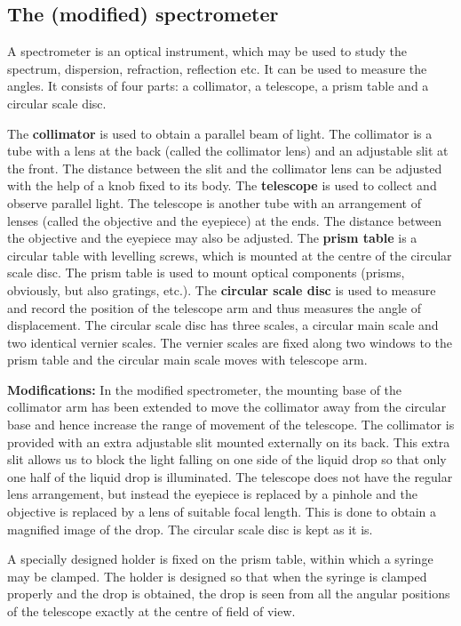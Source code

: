 \subsection*{The (modified) spectrometer}

A spectrometer is an optical instrument, which may be used to study the spectrum, dispersion, refraction, reflection etc. It can be used to measure the angles. It consists of four parts: a collimator, a telescope, a prism table and a circular scale disc.

The \textbf{collimator} is used to obtain a parallel beam of light. The collimator is a tube with a lens at the back (called the collimator lens) and an adjustable slit at the front. The distance between the slit and the collimator lens can be adjusted with the help of a knob fixed to its body. The \textbf{telescope} is used to collect and observe parallel light. The telescope is another tube with an arrangement of lenses (called the objective and the eyepiece) at the ends. The distance between the objective and the eyepiece may also be adjusted. The \textbf{prism table} is a circular table with levelling screws, which is mounted at the centre of the circular scale disc. The prism table is used to mount optical components (prisms, obviously, but also gratings, etc.).  The \textbf{circular scale disc} is used to measure and record the position of the telescope arm and thus measures the angle of displacement. The circular scale disc has three scales, a circular main scale and two identical vernier scales. The vernier scales are fixed along two windows to the prism table and the circular main scale moves with telescope arm.  

\textbf{Modifications:} In the modified spectrometer, the mounting base of the collimator arm has been extended to move the collimator away from the circular base and hence increase the range of movement of the telescope. The collimator is provided with an extra adjustable slit mounted externally on its back. This extra slit allows us to block the light falling on one side of the liquid drop so that only one half of the liquid drop is illuminated. The telescope does not have the regular lens arrangement, but instead the eyepiece is replaced by a pinhole and the objective is replaced by a lens of suitable focal length. This is done to obtain a magnified image of the drop. The circular scale disc is kept as it is. 

A specially designed holder is fixed on the prism table, within which a syringe may be clamped. The holder is designed so that when the syringe is clamped properly and the drop is obtained, the drop is seen from all the angular positions of the telescope exactly at the centre of field of view. 

